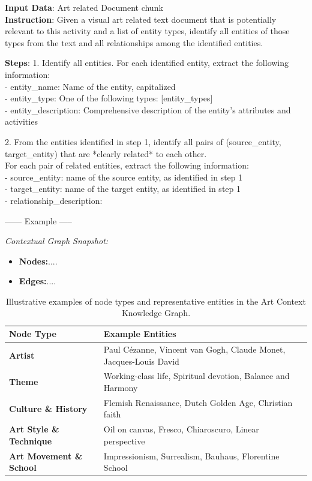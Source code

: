 \documentclass[sigconf,screen, review,anonymous]{acmart}
\newcommand{\customfont}{}
\begin{document}
\begin{tcolorbox}[breakable, fontupper=\customfont, title=Prompt for Node and edge extraction]
{\small
\textbf{Input Data}: Art related Document chunk\\
\textbf{Instruction}: 
Given a visual art related text document that is potentially relevant to this activity and a list of entity types, identify all entities of those types from the text and all relationships among the identified entities.


\textbf{Steps}:
1. Identify all entities. For each identified entity, extract the following information: \\
- entity\_name: Name of the entity, capitalized \\
- entity\_type: One of the following types: [{entity\_types}] \\
- entity\_description: Comprehensive description of the entity's attributes and activities


2. From the entities identified in step 1, identify all pairs of (source\_entity, target\_entity) that are *clearly related* to each other. \\
For each pair of related entities, extract the following information: \\ 
- source\_entity: name of the source entity, as identified in step 1 \\ 
- target\_entity: name of the target entity, as identified in step 1 \\
- relationship\_description: 



------ Example -----

\textit{Contextual Graph Snapshot:}
\begin{itemize}
  \item \textbf{Nodes:}....
  \item \textbf{Edges:}....
\end{itemize}

}
\end{tcolorbox}




\begin{table}[h]
\centering 
\caption{Illustrative examples of node types and representative entities in the Art Context Knowledge Graph.}
\label{tab:node_examples}
\begin{tabular}{ll}
\toprule
\textbf{Node Type}         & \textbf{Example Entities} \\
\midrule
\textbf{Artist}                    & Paul Cézanne, Vincent van Gogh, Claude Monet, Jacques-Louis David \\
\textbf{Theme}                     & Working-class life, Spiritual devotion, Balance and Harmony \\
\textbf{Culture \& History}        & Flemish Renaissance, Dutch Golden Age, Christian faith  \\
\textbf{Art Style \& Technique}    & Oil on canvas, Fresco, Chiaroscuro, Linear perspective \\
\textbf{Art Movement \& School}    & Impressionism, Surrealism, Bauhaus, Florentine School \\
\bottomrule
\end{tabular}
\end{table}
\end{document}
